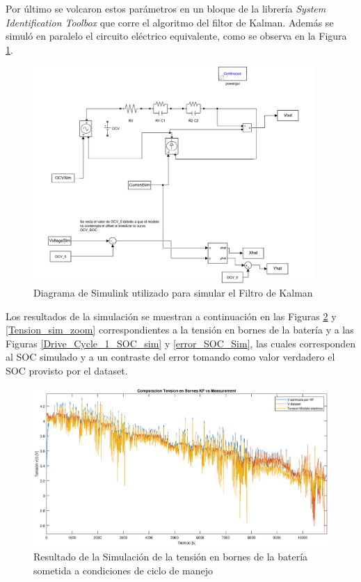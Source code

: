 \documentclass[10pt,a4paper]{article}
\begin{document}
Por último se volcaron estos parámetros en un bloque de la librería \emph{System
Identification Toolbox} que corre el algoritmo del filtor de Kalman. Además se
simuló en paralelo el circuito eléctrico equivalente, como se observa en la
Figura \ref{simulink_diagram}.

\begin{figure}[h!]
    \begin{center}
	\includegraphics[width=0.95\textwidth]{simulink.pdf}
	\caption{Diagrama de Simulink utilizado para simular el Filtro de Kalman}
	\label{simulink_diagram}
    \end{center}
\end{figure}

Los resultados de la simulación se muestran a continuación en las Figuras
\ref{Tension_sim} y \ref{Tension_sim_zoom} correspondientes a la tensión en
bornes de la batería y  a las Figuras \ref{Drive_Cycle_1_SOC_sim} y
\ref{error_SOC_Sim}, las cuales corresponden al SOC simulado y a un contraste
del error tomando como valor verdadero el SOC provisto por el dataset.

\begin{figure}[h!]
    \begin{center}
	\includegraphics[width=1\textwidth]{Tension_Sim.eps}
	\caption{Resultado de la Simulación de la tensión en bornes de la 
	batería sometida a condiciones de ciclo de manejo}
	\label{Tension_sim}
    \end{center}
\end{figure}
\end{document}
